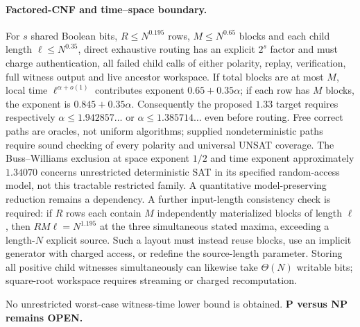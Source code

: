 \documentclass[11pt]{article}
\begin{document}
\paragraph{Factored-CNF and time--space boundary.}
For $s$ shared Boolean bits, $R\le N^{0.195}$ rows,
$M\le N^{0.65}$ blocks and each child length
$\ell\le N^{0.35}$, direct exhaustive routing has an
explicit $2^s$ factor and must charge authentication,
all failed child calls of either polarity, replay,
verification, full witness output and live ancestor
workspace. If total blocks are at most $M$, local
time $\ell^{\alpha+o(1)}$ contributes exponent
$0.65+0.35\alpha$; if each row has $M$ blocks, the
exponent is $0.845+0.35\alpha$. Consequently
the proposed $1.33$ target requires respectively
$\alpha\le1.942857\ldots$ or
$\alpha\le1.385714\ldots$ even before routing.
Free correct paths are oracles, not uniform algorithms;
supplied nondeterministic paths require sound checking
of every polarity and universal UNSAT coverage.
The Buss--Williams exclusion at space exponent $1/2$
and time exponent approximately $1.34070$ concerns
unrestricted deterministic SAT in its specified
random-access model, not this tractable restricted
family. A quantitative model-preserving reduction
remains a dependency.
A further input-length consistency check is required:
if $R$ rows each contain $M$ independently materialized
blocks of length $\ell$, then $RM\ell=N^{1.195}$
at the three simultaneous stated maxima, exceeding a
length-$N$ explicit source. Such a layout must instead
reuse blocks, use an implicit generator with charged access,
or redefine the source-length parameter. Storing all
positive child witnesses simultaneously can likewise take
$\Theta(N)$ writable bits; square-root workspace requires
streaming or charged recomputation.

 No unrestricted worst-case
witness-time lower bound is obtained.
\textbf{P versus NP remains OPEN.}
\end{document}
